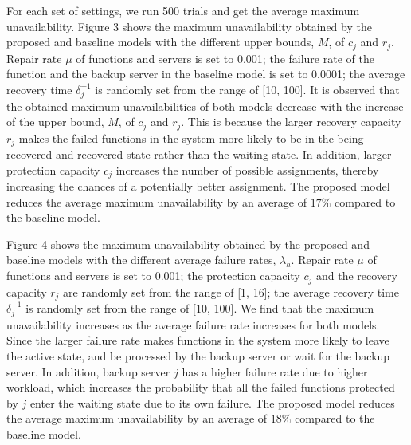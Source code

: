 \documentclass[conference]{IEEEtran}
\begin{document}

For each set of settings, we run 500 trials and get the average maximum unavailability. Figure 3 shows the maximum unavailability obtained by the proposed and baseline models with the different upper bounds, $M$, of $c_j$ and $r_j$. Repair rate $\mu$ of functions and servers is set to 0.001; the failure rate of the function and the backup server in the baseline model is set to 0.0001; the average recovery time $\delta_j^{-1}$ is randomly set from the range of [10, 100]. It is observed that the obtained maximum unavailabilities of both models decrease with the increase of the upper bound, $M$, of $c_j$ and $r_j$. This is because the larger recovery capacity $r_j$ makes the failed functions in the system more likely to be in the being recovered and recovered state rather than the waiting state. In addition, larger protection capacity $c_j$ increases the number of possible assignments, thereby increasing the chances of a potentially better assignment. The proposed model reduces the average maximum unavailability by an average of $17\%$ compared to the baseline model.

\begin{comment} 
and in the vast majority of cases, the proposed model yield a smaller maximum unavailability among functions of the optimal assignment than the baseline model. The proposed model reduce the average maximum unavailability by an average of $19.3\%$ compared to the baseline model.
\end{comment}



Figure 4 shows the maximum unavailability obtained by the proposed and baseline models with the different average failure rates, $\lambda_h$. Repair rate $\mu$ of functions and servers is set to 0.001; the protection capacity $c_j$ and the recovery capacity $r_j$ are randomly set from the range of [1, 16]; the average recovery time $\delta_j^{-1}$ is randomly set from the range of [10, 100]. We find that the maximum unavailability increases as the average failure rate increases for both models. Since the larger failure rate makes functions in the system more likely to leave the active state, and be processed by the backup server or wait for the backup server. In addition, backup server $j$ has a higher failure rate due to higher workload, which increases the probability that all the failed functions protected by $j$ enter the waiting state due to its own failure. The proposed model reduces the average maximum unavailability by an average of $18\%$ compared to the baseline model.
\end{document}
